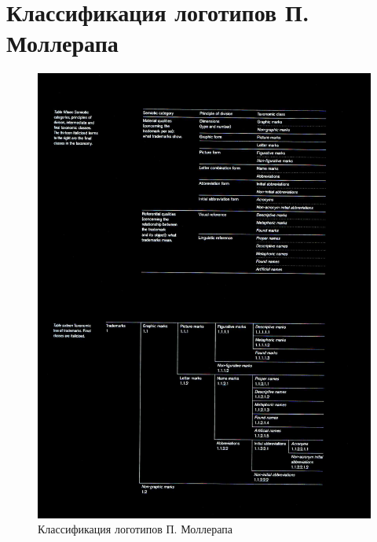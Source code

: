 \section{Классификация логотипов П. Моллерапа}
\label{app:mollerup}

\begin{figure}[ht]
  \centering
  \includegraphics[width=.8\linewidth]{images/mollerup1}
  \caption{Классификация логотипов П. Моллерапа}
  \label{fig:mollerup1}
\end{figure}

